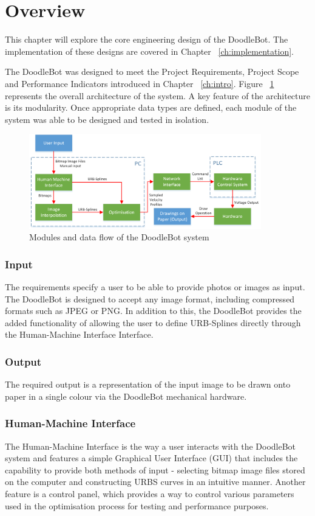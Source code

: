\section{Overview}
	This chapter will explore the core engineering design of the DoodleBot. The implementation of these designs are covered in Chapter ~\ref{ch:implementation}.

	The DoodleBot was designed to meet the Project Requirements, Project Scope and Performance Indicators introduced in Chapter ~\ref{ch:intro}. Figure ~\ref{fig:system} represents the overall architecture of the system. A key feature of the architecture is its modularity. Once appropriate data types are defined, each module of the system was able to be designed and tested in isolation. 
\begin{figure}[h]
\centering
\includegraphics[width=0.9\textwidth]{figures/systemDesign/overview.png}
\caption{Modules and data flow of the DoodleBot system}
\label{fig:system}
\end{figure}

	\subsubsection*{Input}
		The requirements specify a user to be able to provide photos or images as input. The DoodleBot is designed to accept any image format, including compressed formats such as JPEG or PNG. In addition to this, the DoodleBot provides the added functionality of allowing the user to define URB-Splines directly through the Human-Machine Interface Interface.
		
	\subsubsection*{Output}
		The required output is a representation of the input image to be drawn onto paper in a single colour via the DoodleBot mechanical hardware.
		
	\subsubsection*{Human-Machine Interface} 
		The Human-Machine Interface is the way a user interacts with the DoodleBot system and features a simple Graphical User Interface (GUI) that includes the capability to provide both methods of input - selecting bitmap image files stored on the computer and constructing URBS curves in an intuitive manner. Another feature is a control panel, which provides a way to control various parameters used in the optimisation process for testing and performance purposes.
		
